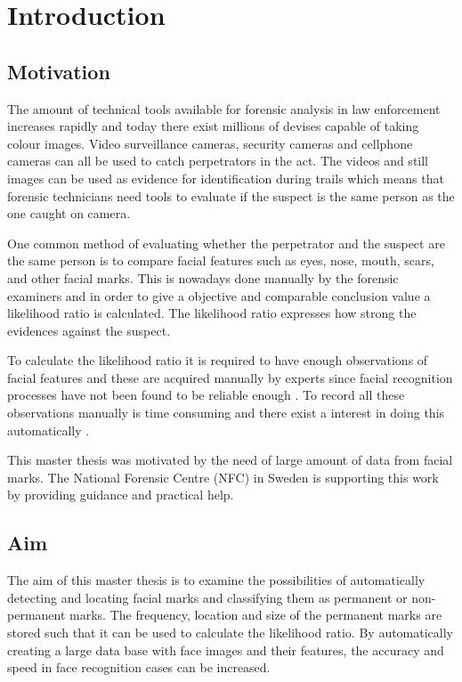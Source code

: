 \chapter{Introduction}\label{cha:intro}
\section{Motivation}
The amount of technical tools available for forensic analysis in law enforcement increases rapidly and today there exist millions of devises capable of taking colour images. Video surveillance cameras, security cameras and cellphone cameras can all be used to catch perpetrators in the act. The videos and still images can be used as evidence for identification during trails which means that forensic technicians need tools to evaluate if the suspect is the same person as the one caught on camera.

One common method of evaluating whether the perpetrator and the suspect are the same person is to compare facial features such as eyes, nose, mouth, scars, and other facial marks. This is nowadays done manually \cite{face_soft} by the forensic examiners and in order to give a objective and comparable conclusion value a likelihood ratio \cite{NFC_stat} is calculated. The likelihood ratio expresses how strong the evidences against the suspect.

To calculate the likelihood ratio it is required to have enough observations of facial features and these are acquired manually by experts since facial recognition processes have not been found to be reliable enough \cite{automatic_detector_2015}. To record all these observations manually is time consuming and there exist a interest in doing this automatically \cite{forensic_identification}. 

This master thesis was motivated by the need of large amount of data from facial marks. The National Forensic Centre (NFC) in Sweden is supporting this work by providing guidance and practical help.  

\section{Aim}

The aim of this master thesis is to examine the possibilities of automatically detecting and locating facial marks and classifying them as permanent or non-permanent marks. The frequency, location and size of the permanent marks are stored such that it can be used to calculate the likelihood ratio. By automatically creating a large data base with face images and their features, the accuracy and speed in face recognition cases can be increased. 

